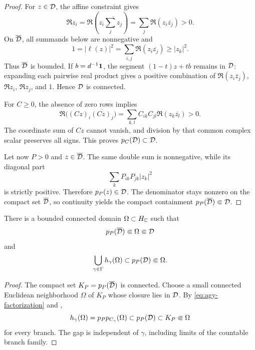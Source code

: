 \begin{proof}
For \(z\in\mathcal{D}\), the affine constraint gives
\[
 \Re z_i
 =\Re\!\left(z_i\overline{\sum_jz_j}\right)
 =\sum_j\Re(z_i\overline{z_j})>0.
\]
On \(\overline{\mathcal{D}}\), all summands below are nonnegative and
\[
 1=|\ell(z)|^2
  =\sum_{i,j}\Re(z_i\overline{z_j})
  \geq |z_k|^2.
\]
Thus \(\overline{\mathcal{D}}\) is bounded.  If
\(b=d^{-1}\mathbf{1}\), the segment \((1-t)z+tb\) remains in \(\mathcal{D}\): expanding
each pairwise real product gives a positive combination of
\(\Re(z_i\bar z_j)\), \(\Re z_i\), \(\Re z_j\), and \(1\).  Hence \(\mathcal{D}\)
is connected.

For \(C\geq0\), the absence of zero rows implies
\[
 \Re\bigl((Cz)_i\overline{(Cz)_j}\bigr)
 =\sum_{k,l}C_{ik}C_{jl}\Re(z_k\overline{z_l})>0.
\]
The coordinate sum of \(Cz\) cannot vanish, and division by that common
complex scalar preserves all signs.  This proves \(p_C(\mathcal{D})\subset\mathcal{D}\).

Let now \(P>0\) and \(z\in\overline{\mathcal{D}}\).  The same double sum is
nonnegative, while its diagonal part
\[
 \sum_kP_{ik}P_{jk}|z_k|^2
\]
is strictly positive.  Therefore \(p_P(z)\in\mathcal{D}\).  The denominator stays
nonzero on the compact set \(\overline{\mathcal{D}}\), so continuity yields the
compact containment \(p_P(\overline{\mathcal{D}})\Subset\mathcal{D}\).
\end{proof}

\begin{theorem}
\label{thm:common-domain}
There is a bounded connected domain \(\Omega\subset H_{\mathbb{C}}\) such that
\begin{equation}
 p_P(\overline{\mathcal{D}})\Subset\Omega\Subset\mathcal{D}
 \label{eq:omega-gap}
\end{equation}
and
\begin{equation}
 \bigcup_{\gamma\in\Gamma}h_\gamma(\Omega)
 \subset p_P(\mathcal{D})\Subset\Omega.
 \label{eq:common-image}
\end{equation}
\end{theorem}

\begin{proof}
The compact set \(K_P=p_P(\overline{\mathcal{D}})\) is connected.  Choose a small
connected Euclidean neighborhood \(\Omega\) of \(K_P\) whose closure lies
in \(\mathcal{D}\).  By \eqref{eq:agy-factorization} and
,
\[
 h_\gamma(\Omega)
 =p_Pp_{C_\gamma}(\Omega)
 \subset p_P(\mathcal{D})
 \subset K_P\Subset\Omega
\]
for every branch.  The gap is independent of \(\gamma\), including limits
of the countable branch family.
\end{proof}

